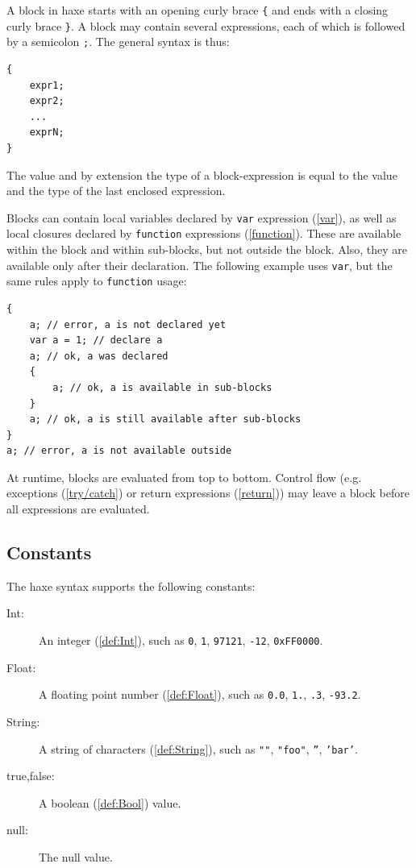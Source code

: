 \documentclass{article}
\newcommand{\expr}[1]{\texttt{#1}}
\newcommand{\tref}[2]{#1 (\ref{#2})}
\begin{document}
A block in haxe starts with an opening curly brace \expr{\{} and ends with a closing curly brace \expr{\}}. A block may contain several expressions, each of which is followed by a semicolon \expr{;}. The general syntax is thus:

\begin{lstlisting}
{
	expr1;
	expr2;
	...
	exprN;
}
\end{lstlisting}
The value and by extension the type of a block-expression is equal to the value and the type of the last enclosed expression.

Blocks can contain local variables declared by \tref{\expr{var} expression}{var}, as well as local closures declared by \tref{\expr{function} expressions}{function}. These are available within the block and within sub-blocks, but not outside the block. Also, they are available only after their declaration. The following example uses \expr{var}, but the same rules apply to \expr{function} usage:

\begin{lstlisting}
{
	a; // error, a is not declared yet
	var a = 1; // declare a
	a; // ok, a was declared
	{
		a; // ok, a is available in sub-blocks
	}
	a; // ok, a is still available after sub-blocks
}
a; // error, a is not available outside
\end{lstlisting}
At runtime, blocks are evaluated from top to bottom. Control flow (e.g. \tref{exceptions}{try/catch} or \tref{return expressions}{return}) may leave a block before all expressions 
are evaluated.


\subsection{Constants}
\label{Constants}

The haxe syntax supports the following constants:

\begin{description}
	\item[Int:] An \tref{integer}{def:Int}, such as \expr{0}, \expr{1}, \expr{97121}, \expr{-12}, \expr{0xFF0000}.
	\item[Float:] A \tref{floating point number}{def:Float}, such as \expr{0.0}, \expr{1.}, \expr{.3}, \expr{-93.2}.
	\item[String:] A \tref{string of characters}{def:String}, such as \expr{""}, \expr{"foo"}, \expr{''}, \expr{'bar'}.
	\item[true,false:] A \tref{boolean}{def:Bool} value.
	\item[null:] The null value.
\end{description}
\end{document}
